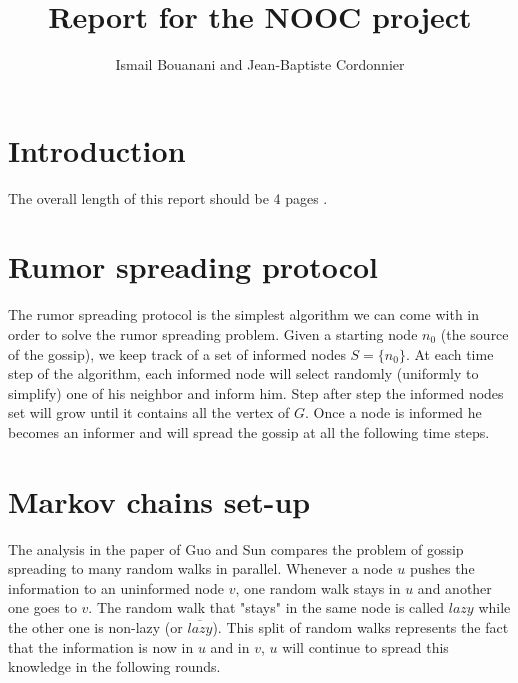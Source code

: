 \documentclass[10pt,journal,a4paper]{IEEEtran}
\begin{document}
%
\title{Report for the NOOC project}
\author{Ismail Bouanani and Jean-Baptiste Cordonnier}


\newcommand{\norm}[1]{\left\lVert#1\right\rVert}

\maketitle
\IEEEdisplaynotcompsoctitleabstractindextext

\section{Introduction}

The overall length of this report should be 4 pages . 


\section{Rumor spreading protocol}

The rumor spreading protocol is the simplest algorithm we can come with in order to solve the rumor spreading problem. Given a starting node $n_0$ (the source of the gossip), we keep track of a set of informed nodes $S = \{n_0\}$. At each time step of the algorithm, each informed node will select randomly (uniformly to simplify) one of his neighbor and inform him. Step after step the informed nodes set will grow until it contains all the vertex of $G$. Once a node is informed he becomes an informer and will spread the gossip at all the following time steps.


\section{Markov chains set-up}

The analysis in the paper of Guo and Sun \cite{GuoSun} compares the problem of gossip spreading to many random walks in parallel. Whenever a node $u$ pushes the information to an uninformed node $v$, one random walk stays in $u$ and another one goes to $v$. The random walk that "stays" in the same node is called $lazy$ while the other one is non-lazy (or $\overline{lazy}$). This split of random walks represents the fact that the information is now in $u$ and in $v$, $u$ will continue to spread this knowledge in the following rounds.
\end{document}
